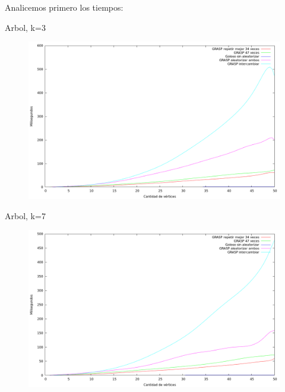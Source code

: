 Analicemos primero los tiempos:

Arbol, k=3
\vspace*{0.5cm}

\begin{figure}[h]
  \begin{center}
    \includegraphics[scale=0.35]{imagenes/ej6-arbol-k3-tiempo.png}
  \end{center}
\end{figure}

\vspace*{0.5cm}

Arbol, k=7
\vspace*{0.5cm}

\begin{figure}[h]
  \begin{center}
    \includegraphics[scale=0.35]{imagenes/ej6-arbol-k7-tiempo.png}
  \end{center}
\end{figure}

